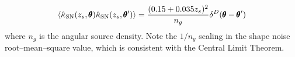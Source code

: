 \begin{equation}
\label{eq:2:shapenoise}
\left\langle\hat{\kappa}_{\rm SN}(z_s,\pmb{\theta})\hat{\kappa}_{\rm SN}(z_s,\pmb{\theta}')\right\rangle = \frac{(0.15+0.035z_s)^2}{n_g}\delta^D(\pmb{\theta}-\pmb{\theta}')
\end{equation} 
%
where $n_g$ is the angular source density. Note the $1/n_g$ scaling in the shape noise root--mean--square value, which is consistent with the Central Limit Theorem.    

%